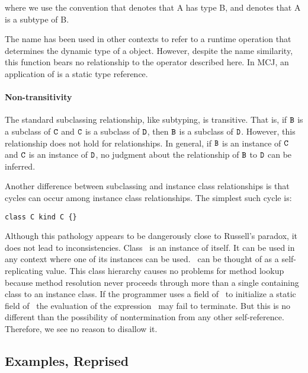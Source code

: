\documentclass[10pt]{acm-sigplan}
\begin{document}
\hspace{-.43cm}where we use the convention that {} denotes
that {\txt A} has type {\txt B}, and {} denotes that {\txt A}
is a subtype of {\txt B}.

The name {} has been used in other contexts to refer to a
runtime operation that determines the dynamic type of a object.
However, despite the name similarity, this function bears no
relationship to the operator described here.  In MCJ, an application
of {} is a static type reference.

\paragraph{Non-transitivity}

The standard subclassing relationship, like subtyping, is transitive.
That is, if $\mbox {\tt B}$ is a subclass of $\mathtt{{C}}$ and $\mathtt{{C}}$ is a subclass of $\mathtt{{D}}$,
then $\mbox {\tt B}$ is a subclass of $\mathtt{{D}}$.  However, this relationship does not
hold for {} relationships.  In general, if $\mbox {\tt B}$ is an
instance of $\mathtt{{C}}$ and $\mathtt{{C}}$ is an instance of $\mathtt{{D}}$, no judgment
about the relationship of $\mbox {\tt B}$ to $\mathtt{{D}}$ can be inferred.

Another difference between subclassing and instance class
relationships is that cycles can occur among instance class
relationships. The simplest such cycle is:

\begin{verbatim}
class C kind C {}
\end{verbatim}

Although this pathology appears to be dangerously close to Russell's
paradox, it does not lead to inconsistencies.  Class \C\ is an
instance of itself. It can be used in any context where one of its
instances can be used.  \C\ can be thought of as a self-replicating
value. This class hierarchy causes no problems for method lookup
because method resolution never proceeds through more than a single
containing class to an instance class. If the programmer uses a field
of \C\ to initialize a static field of \C\, the evaluation of the
expression \C\ may fail to terminate.  But this is no different than
the possibility of nontermination from any other self-reference.
Therefore, we see no reason to disallow it.


\subsection{Examples, Reprised}
\end{document}
